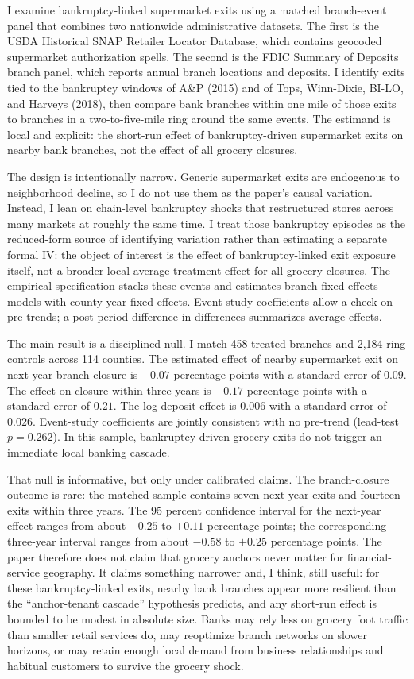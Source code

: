 \documentclass[12pt]{article}
\begin{document}
I examine bankruptcy-linked supermarket exits using a matched branch-event panel that combines two nationwide administrative datasets. The first is the USDA Historical SNAP Retailer Locator Database, which contains geocoded supermarket authorization spells. The second is the FDIC Summary of Deposits branch panel, which reports annual branch locations and deposits. I identify exits tied to the bankruptcy windows of A\&P (2015) and of Tops, Winn-Dixie, BI-LO, and Harveys (2018), then compare bank branches within one mile of those exits to branches in a two-to-five-mile ring around the same events. The estimand is local and explicit: the short-run effect of bankruptcy-driven supermarket exits on nearby bank branches, not the effect of all grocery closures.

The design is intentionally narrow. Generic supermarket exits are endogenous to neighborhood decline, so I do not use them as the paper's causal variation. Instead, I lean on chain-level bankruptcy shocks that restructured stores across many markets at roughly the same time. I treat those bankruptcy episodes as the reduced-form source of identifying variation rather than estimating a separate formal IV: the object of interest is the effect of bankruptcy-linked exit exposure itself, not a broader local average treatment effect for all grocery closures. The empirical specification stacks these events and estimates branch fixed-effects models with county-year fixed effects. Event-study coefficients allow a check on pre-trends; a post-period difference-in-differences summarizes average effects.

The main result is a disciplined null. I match 458 treated branches and 2,184 ring controls across 114 counties. The estimated effect of nearby supermarket exit on next-year branch closure is \(-0.07\) percentage points with a standard error of \(0.09\). The effect on closure within three years is \(-0.17\) percentage points with a standard error of \(0.21\). The log-deposit effect is \(0.006\) with a standard error of \(0.026\). Event-study coefficients are jointly consistent with no pre-trend (lead-test \(p = 0.262\)). In this sample, bankruptcy-driven grocery exits do not trigger an immediate local banking cascade.

That null is informative, but only under calibrated claims. The branch-closure outcome is rare: the matched sample contains seven next-year exits and fourteen exits within three years. The 95 percent confidence interval for the next-year effect ranges from about \(-0.25\) to \(+0.11\) percentage points; the corresponding three-year interval ranges from about \(-0.58\) to \(+0.25\) percentage points. The paper therefore does not claim that grocery anchors never matter for financial-service geography. It claims something narrower and, I think, still useful: for these bankruptcy-linked exits, nearby bank branches appear more resilient than the ``anchor-tenant cascade'' hypothesis predicts, and any short-run effect is bounded to be modest in absolute size. Banks may rely less on grocery foot traffic than smaller retail services do, may reoptimize branch networks on slower horizons, or may retain enough local demand from business relationships and habitual customers to survive the grocery shock.
\end{document}
